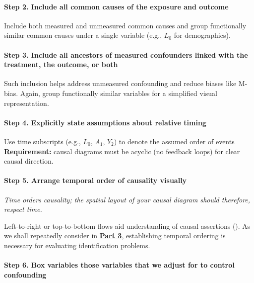 \documentclass[
  singlecolumn]{article}
\let\oldparagraph\paragraph
\renewcommand{\paragraph}[1]{\oldparagraph{#1}\mbox{}}
\begin{document}
\paragraph{Step 2. Include all common causes of the exposure and
outcome}\label{step-2.-include-all-common-causes-of-the-exposure-and-outcome}

Include both measured and unmeasured common causes and group
functionally similar common causes under a single variable (e.g.,
\(L_0\) for demographics).

\paragraph{Step 3. Include all ancestors of measured confounders linked
with the treatment, the outcome, or
both}\label{step-3.-include-all-ancestors-of-measured-confounders-linked-with-the-treatment-the-outcome-or-both}

Such inclusion helps address unmeasured confounding and reduce biases
like M-bias. Again, group functionally similar variables for a
simplified visual representation.

\paragraph{Step 4. Explicitly state assumptions about relative
timing}\label{step-4.-explicitly-state-assumptions-about-relative-timing}

Use time subscripts (e.g., \(L_0\), \(A_1\), \(Y_2\)) to denote the
assumed order of events \textbf{Requirement:} causal diagrams must be
acyclic (no feedback loops) for clear causal direction.

\paragraph{Step 5. Arrange temporal order of causality
visually}\label{step-5.-arrange-temporal-order-of-causality-visually}

\emph{Time orders causality; the spatial layout of your causal diagram
should therefore, respect time.}

Left-to-right or top-to-bottom flows aid understanding of causal
assertions (). As we shall
repeatedly consider in \hyperref[sec-part3]{\textbf{Part 3}},
establishing temporal ordering is necessary for evaluating
identification problems.

\paragraph{Step 6. Box variables those variables that we adjust for to
control
confounding}\label{step-6.-box-variables-those-variables-that-we-adjust-for-to-control-confounding}
\end{document}
